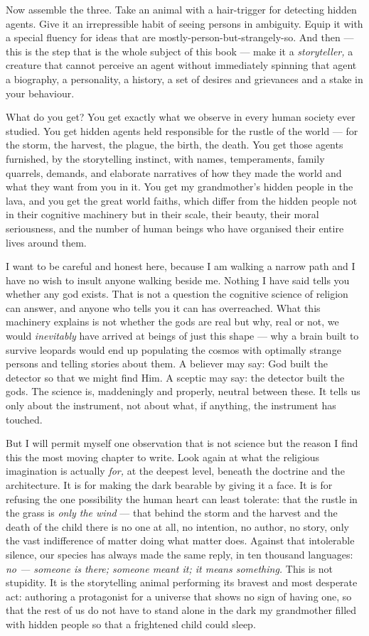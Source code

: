 Now assemble the three. Take an animal with a hair-trigger for detecting hidden agents. Give it an irrepressible habit of seeing persons in ambiguity. Equip it with a special fluency for ideas that are mostly-person-but-strangely-so. And then — this is the step that is the whole subject of this book — make it a \emph{storyteller,} a creature that cannot perceive an agent without immediately spinning that agent a biography, a personality, a history, a set of desires and grievances and a stake in your behaviour.

What do you get? You get exactly what we observe in every human society ever studied. You get hidden agents held responsible for the rustle of the world — for the storm, the harvest, the plague, the birth, the death. You get those agents furnished, by the storytelling instinct, with names, temperaments, family quarrels, demands, and elaborate narratives of how they made the world and what they want from you in it. You get my grandmother's hidden people in the lava, and you get the great world faiths, which differ from the hidden people not in their cognitive machinery but in their scale, their beauty, their moral seriousness, and the number of human beings who have organised their entire lives around them.

I want to be careful and honest here, because I am walking a narrow path and I have no wish to insult anyone walking beside me. Nothing I have said tells you whether any god exists. That is not a question the cognitive science of religion can answer, and anyone who tells you it can has overreached. What this machinery explains is not whether the gods are real but why, real or not, we would \emph{inevitably} have arrived at beings of just this shape — why a brain built to survive leopards would end up populating the cosmos with optimally strange persons and telling stories about them. A believer may say: God built the detector so that we might find Him. A sceptic may say: the detector built the gods. The science is, maddeningly and properly, neutral between these. It tells us only about the instrument, not about what, if anything, the instrument has touched.

But I will permit myself one observation that is not science but the reason I find this the most moving chapter to write. Look again at what the religious imagination is actually \emph{for,} at the deepest level, beneath the doctrine and the architecture. It is for making the dark bearable by giving it a face. It is for refusing the one possibility the human heart can least tolerate: that the rustle in the grass is \emph{only the wind} — that behind the storm and the harvest and the death of the child there is no one at all, no intention, no author, no story, only the vast indifference of matter doing what matter does. Against that intolerable silence, our species has always made the same reply, in ten thousand languages: \emph{no — someone is there; someone meant it; it means something.} This is not stupidity. It is the storytelling animal performing its bravest and most desperate act: authoring a protagonist for a universe that shows no sign of having one, so that the rest of us do not have to stand alone in the dark my grandmother filled with hidden people so that a frightened child could sleep.

